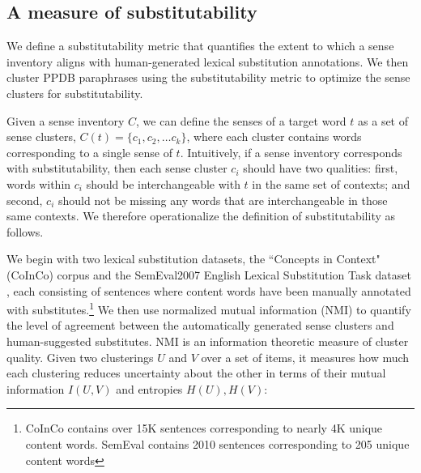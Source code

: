 \documentclass[11pt]{article}
\begin{document}
\subsection{A measure of substitutability}
\label{nmi} 

We define a substitutability metric that quantifies the extent to which a sense inventory aligns with human-generated lexical substitution annotations. We then cluster PPDB paraphrases using the substitutability metric to optimize the sense clusters for substitutability. 

Given a sense inventory $C$, we can define the senses of a target word $t$ as a set of sense clusters, $C(t) = \{c_1, c_2, \dots c_k\}$, where each cluster contains words corresponding to a single sense of $t$. Intuitively, if a sense inventory corresponds with substitutability, then each sense cluster $c_i$ should have two qualities: first, words within $c_i$ should be interchangeable with $t$ in the same set of contexts; and second, $c_i$ should not be missing any words that are interchangeable in those same contexts. We therefore operationalize the definition of substitutability as follows. 

We begin with two
lexical substitution datasets, the ``Concepts in Context" (CoInCo) corpus \cite{kremer-EtAl:2014:EACL} and the SemEval2007 English Lexical Substitution Task dataset \cite{mccarthy-navigli:07}, each consisting of sentences where content words have been manually annotated with substitutes.\footnote{CoInCo contains over 15K sentences corresponding to nearly 4K unique content words. SemEval contains 2010 sentences corresponding to 205 unique content words} 
We then use normalized mutual information (NMI) \cite{strehl2002cluster} to quantify the level of agreement between the automatically generated sense clusters and human-suggested substitutes. NMI is an information theoretic measure of cluster quality. Given two clusterings $U$ and $V$ over a set of items, it measures how much each clustering reduces uncertainty about the other \cite{vinh2009information} in terms of their mutual information $I(U,V)$ and entropies $H(U), H(V)$:
\end{document}
